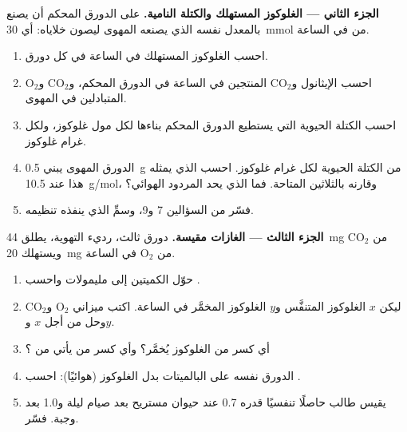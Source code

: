 \begin{problem}
\medskip
\noindent\textbf{الجزء الثاني --- الغلوكوز المستهلك والكتلة النامية.}
على الدورق المحكم أن يصنع  بالمعدل نفسه الذي يصنعه المهوى ليصون
خلاياه: أي \qty{30}{mmol} من  في الساعة.
\begin{enumerate}[resume]
  \item احسب الغلوكوز المستهلك في الساعة في كل دورق.
  \item احسب الإيثانول و$\mathrm{CO_2}$ المنتجين في الساعة في الدورق
        المحكم، و$\mathrm{CO_2}$ و$\mathrm{O_2}$ المتبادلين في المهوى.
  \item احسب الكتلة الحيوية التي يستطيع الدورق المحكم بناءها لكل مول
        غلوكوز، ولكل غرام غلوكوز.
  \item الدورق المهوى يبني \qty{0.5}{g} من الكتلة الحيوية لكل غرام
        غلوكوز. احسب  الذي يمثله هذا عند \qty{10.5}{g/mol}، وقارنه
        بالثلاثين  المتاحة. فما الذي يحد المردود الهوائي؟
  \item فسّر  من السؤالين 7 و9، وسمِّ  الذي ينفذه
        تنظيمه.
\end{enumerate}

\medskip
\noindent\textbf{الجزء الثالث --- الغازات مقيسة.}
دورق ثالث، رديء التهوية، يطلق \qty{44}{mg} من $\mathrm{CO_2}$
ويستهلك \qty{20}{mg} من $\mathrm{O_2}$ في الساعة.
\begin{enumerate}[resume]
  \item حوّل الكميتين إلى مليمولات واحسب .
  \item ليكن $x$ الغلوكوز المتنفَّس و$y$ الغلوكوز المخمَّر في الساعة.
        اكتب ميزاني $\mathrm{O_2}$ و$\mathrm{CO_2}$ وحل من أجل $x$
        و$y$.
  \item أي كسر من الغلوكوز يُخمَّر؟ وأي كسر من  يأتي من ؟
  \item الدورق نفسه على البالميتات بدل الغلوكوز (هوائيًا): احسب
        .
  \item يقيس طالب حاصلًا تنفسيًا قدره 0.7 عند حيوان مستريح بعد صيام
        ليلة و1.0 بعد وجبة. فسّر.
\end{enumerate}


\end{problem}
